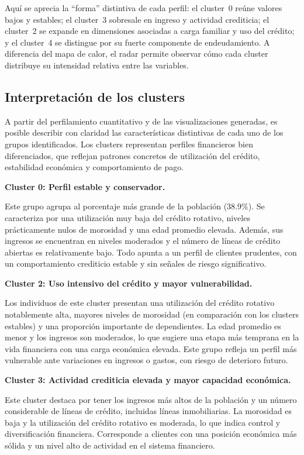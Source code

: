 \documentclass[a4paper,12pt]{article}
\begin{document}
Aquí se aprecia la “forma” distintiva de cada perfil: el cluster~0 reúne valores bajos y estables; el cluster~3 
sobresale en ingreso y actividad crediticia; el cluster~2 se expande en dimensiones asociadas a carga familiar y 
uso del crédito; y el cluster~4 se distingue por su fuerte componente de endeudamiento. A diferencia del mapa de 
calor, el radar permite observar cómo cada cluster distribuye su intensidad relativa entre las variables.

\subsection{Interpretación de los clusters}

A partir del perfilamiento cuantitativo y de las visualizaciones generadas, es posible describir con claridad las 
características distintivas de cada uno de los grupos identificados. Los clusters representan perfiles financieros 
bien diferenciados, que reflejan patrones concretos de utilización del crédito, estabilidad económica y comportamiento 
de pago.

\textbf{Cluster 0: Perfil estable y conservador.}  

Este grupo agrupa al porcentaje más grande de la población (38.9\%). Se caracteriza por una utilización muy baja 
del crédito rotativo, niveles prácticamente nulos de morosidad y una edad promedio elevada. Además, sus ingresos 
se encuentran en niveles moderados y el número de líneas de crédito abiertas es relativamente bajo. Todo apunta 
a un perfil de clientes prudentes, con un comportamiento crediticio estable y sin señales de riesgo significativo.

\textbf{Cluster 2: Uso intensivo del crédito y mayor vulnerabilidad.} 

Los individuos de este cluster presentan una utilización del crédito rotativo notablemente alta, mayores niveles 
de morosidad (en comparación con los clusters estables) y una proporción importante de dependientes. La edad 
promedio es menor y los ingresos son moderados, lo que sugiere una etapa más temprana en la vida financiera 
con una carga económica elevada. Este grupo refleja un perfil más vulnerable ante variaciones en ingresos o 
gastos, con riesgo de deterioro futuro.

\textbf{Cluster 3: Actividad crediticia elevada y mayor capacidad económica.}  

Este cluster destaca por tener los ingresos más altos de la población y un número considerable de líneas 
de crédito, incluidas líneas inmobiliarias. La morosidad es baja y la utilización del crédito rotativo es 
moderada, lo que indica control y diversificación financiera. Corresponde a clientes con una posición 
económica más sólida y un nivel alto de actividad en el sistema financiero.
\end{document}
